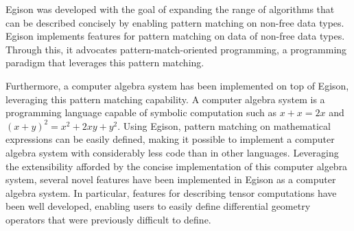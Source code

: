 Egison was developed with the goal of expanding the range of algorithms that can be described concisely by enabling pattern matching on non-free data types.
Egison implements features for pattern matching on data of non-free data types.
Through this, it advocates pattern-match-oriented programming, a programming paradigm that leverages this pattern matching.

Furthermore, a computer algebra system has been implemented on top of Egison, leveraging this pattern matching capability.
A computer algebra system is a programming language capable of symbolic computation such as $x + x = 2 x$ and $(x + y)^2 = x^2 + 2 x y + y^2$.
Using Egison, pattern matching on mathematical expressions can be easily defined, making it possible to implement a computer algebra system with considerably less code than in other languages.
Leveraging the extensibility afforded by the concise implementation of this computer algebra system, several novel features have been implemented in Egison as a computer algebra system.
In particular, features for describing tensor computations have been well developed, enabling users to easily define differential geometry operators that were previously difficult to define.

